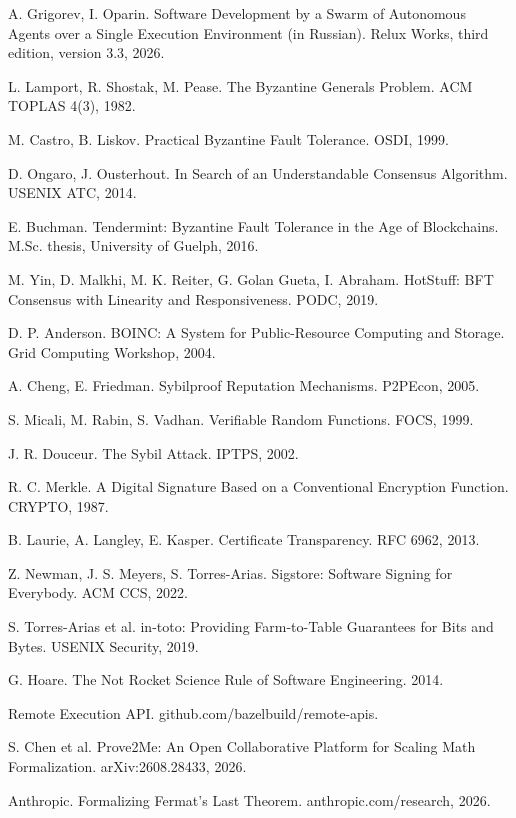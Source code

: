 \begin{english}
\begin{enumerate}[label={[\arabic*]},leftmargin=2.6em,itemsep=2pt]
\item A. Grigorev, I. Oparin. Software Development by a Swarm of Autonomous Agents over a Single Execution Environment (in Russian). Relux Works, third edition, version 3.3, 2026.
\item L. Lamport, R. Shostak, M. Pease. The Byzantine Generals Problem. ACM TOPLAS 4(3), 1982.
\item M. Castro, B. Liskov. Practical Byzantine Fault Tolerance. OSDI, 1999.
\item D. Ongaro, J. Ousterhout. In Search of an Understandable Consensus Algorithm. USENIX ATC, 2014.
\item E. Buchman. Tendermint: Byzantine Fault Tolerance in the Age of Blockchains. M.Sc. thesis, University of Guelph, 2016.
\item M. Yin, D. Malkhi, M. K. Reiter, G. Golan Gueta, I. Abraham. HotStuff: BFT Consensus with Linearity and Responsiveness. PODC, 2019.
\item D. P. Anderson. BOINC: A System for Public-Resource Computing and Storage. Grid Computing Workshop, 2004.
\item A. Cheng, E. Friedman. Sybilproof Reputation Mechanisms. P2PEcon, 2005.
\item S. Micali, M. Rabin, S. Vadhan. Verifiable Random Functions. FOCS, 1999.
\item J. R. Douceur. The Sybil Attack. IPTPS, 2002.
\item R. C. Merkle. A Digital Signature Based on a Conventional Encryption Function. CRYPTO, 1987.
\item B. Laurie, A. Langley, E. Kasper. Certificate Transparency. RFC 6962, 2013.
\item Z. Newman, J. S. Meyers, S. Torres-Arias. Sigstore: Software Signing for Everybody. ACM CCS, 2022.
\item S. Torres-Arias et al. in-toto: Providing Farm-to-Table Guarantees for Bits and Bytes. USENIX Security, 2019.
\item G. Hoare. The Not Rocket Science Rule of Software Engineering. 2014.
\item Remote Execution API. github.com/bazelbuild/remote-apis.
\item S. Chen et al. Prove2Me: An Open Collaborative Platform for Scaling Math Formalization. arXiv:2608.28433, 2026.
\item Anthropic. Formalizing Fermat's Last Theorem. anthropic.com/research, 2026.

\end{enumerate}
\end{english}
